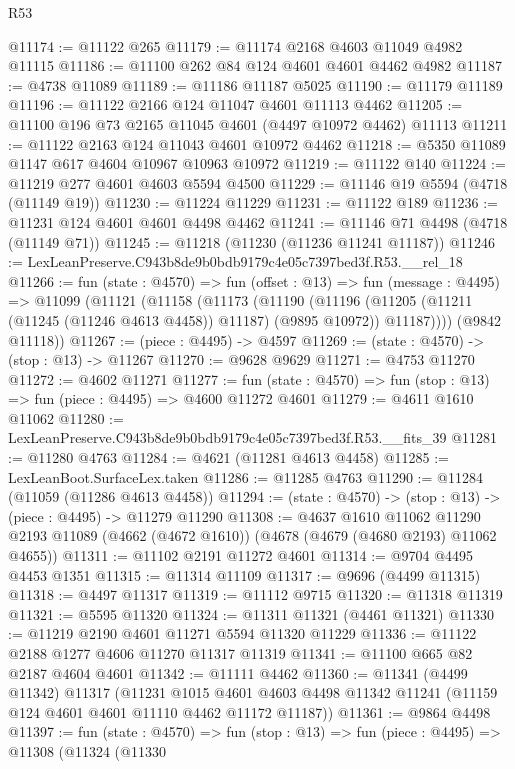\begin{lexlean}{R53}
\begin{coremodule}
@11174 := @11122 @265
@11179 := @11174 @2168 @4603 @11049 @4982 @11115
@11186 := @11100 @262 @84 @124 @4601 @4601 @4462 @4982
@11187 := @4738 @11089
@11189 := @11186 @11187 @5025
@11190 := @11179 @11189
@11196 := @11122 @2166 @124 @11047 @4601 @11113 @4462
@11205 := @11100 @196 @73 @2165 @11045 @4601 (@4497 @10972 @4462) @11113
@11211 := @11122 @2163 @124 @11043 @4601 @10972 @4462
@11218 := @5350 @11089 @1147 @617 @4604 @10967 @10963 @10972
@11219 := @11122 @140
@11224 := @11219 @277 @4601 @4603 @5594 @4500
@11229 := @11146 @19 @5594 (@4718 (@11149 @19))
@11230 := @11224 @11229
@11231 := @11122 @189
@11236 := @11231 @124 @4601 @4601 @4498 @4462
@11241 := @11146 @71 @4498 (@4718 (@11149 @71))
@11245 := @11218 (@11230 (@11236 @11241 @11187))
@11246 := LexLeanPreserve.C943b8de9b0bdb9179c4e05c7397bed3f.R53.__rel_18
@11266 := fun (state : @4570) =>
  fun (offset : @13) =>
  fun (message : @4495) =>
  @11099
    (@11121
      (@11158
        (@11173
          (@11190
            (@11196 (@11205 (@11211 (@11245 (@11246 @4613 @4458)) @11187) (@9895 @10972)) @11187))))
      (@9842 @11118))
@11267 := (piece : @4495) -> @4597
@11269 := (state : @4570) -> (stop : @13) -> @11267
@11270 := @9628 @9629
@11271 := @4753 @11270
@11272 := @4602 @11271
@11277 := fun (state : @4570) => fun (stop : @13) => fun (piece : @4495) => @4600 @11272 @4601
@11279 := @4611 @1610 @11062
@11280 := LexLeanPreserve.C943b8de9b0bdb9179c4e05c7397bed3f.R53.__fits_39
@11281 := @11280 @4763
@11284 := @4621 (@11281 @4613 @4458)
@11285 := LexLeanBoot.SurfaceLex.taken
@11286 := @11285 @4763
@11290 := @11284 (@11059 (@11286 @4613 @4458))
@11294 := (state : @4570) -> (stop : @13) -> (piece : @4495) -> @11279 @11290
@11308 := @4637
    @1610
    @11062
    @11290
    @2193
    @11089
    (@4662 (@4672 @1610))
    (@4678 (@4679 (@4680 @2193) @11062 @4655))
@11311 := @11102 @2191 @11272 @4601
@11314 := @9704 @4495 @4453 @1351
@11315 := @11314 @11109
@11317 := @9696 (@4499 @11315)
@11318 := @4497 @11317
@11319 := @11112 @9715
@11320 := @11318 @11319
@11321 := @5595 @11320
@11324 := @11311 @11321 (@4461 @11321)
@11330 := @11219 @2190 @4601 @11271 @5594 @11320 @11229
@11336 := @11122 @2188 @1277 @4606 @11270 @11317 @11319
@11341 := @11100 @665 @82 @2187 @4604 @4601
@11342 := @11111 @4462
@11360 := @11341
    (@4499 @11342)
    @11317
    (@11231
      @1015
      @4601
      @4603
      @4498
      @11342
      @11241
      (@11159 @124 @4601 @4601 @11110 @4462 @11172 @11187))
@11361 := @9864 @4498
@11397 := fun (state : @4570) =>
  fun (stop : @13) =>
  fun (piece : @4495) =>
  @11308
    (@11324
      (@11330

\end{coremodule}
\end{lexlean}
